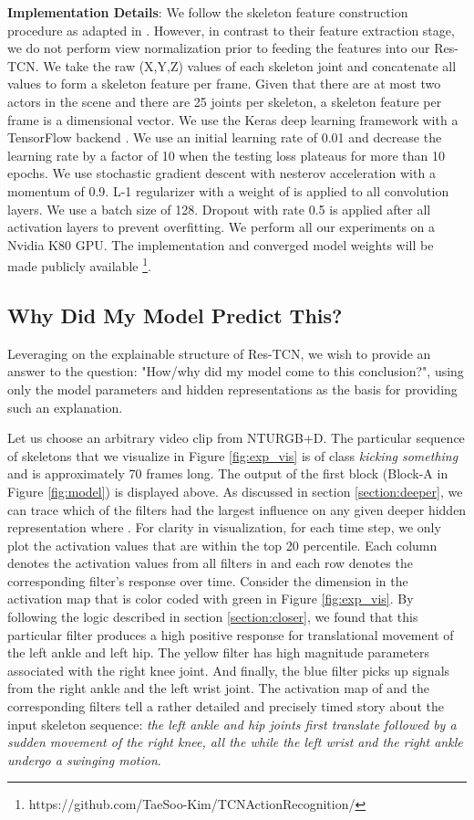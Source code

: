 \documentclass[10pt,twocolumn,letterpaper]{article}
\begin{document}
\textbf{Implementation Details}: We follow the skeleton feature construction procedure as adapted in \cite{nturgdb2016,Song2017}. However, in contrast to their feature extraction stage, we do not perform view normalization prior to feeding the features into our Res-TCN. We take the raw (X,Y,Z) values of each skeleton joint and concatenate all values to form a skeleton feature per frame. Given that there are at most two actors in the scene and there are 25 joints per skeleton, a skeleton feature per frame is a  dimensional vector. We use the Keras deep learning framework \cite{keras} with a TensorFlow backend \cite{tensorflow}. We use an initial learning rate of 0.01 and decrease the learning rate by a factor of 10 when the testing loss plateaus for more than 10 epochs. We use stochastic gradient descent with nesterov acceleration with a momentum of 0.9. L-1 regularizer with a weight of  is applied to all convolution layers. We use a batch size of 128. Dropout \cite{dropout} with rate 0.5 is applied after all activation layers to prevent overfitting. We perform all our experiments on a Nvidia K80 GPU. The implementation and converged model weights will be made publicly available \footnote{https://github.com/TaeSoo-Kim/TCNActionRecognition/}.


\subsection{Why Did My Model Predict This?}
Leveraging on the explainable structure of Res-TCN, we wish to provide an answer to the question: "How/why did my model come to this conclusion?", using only the model parameters and hidden representations as the basis for providing such an explanation. 

Let us choose an arbitrary video clip from NTURGB+D. The particular sequence of skeletons that we visualize in Figure \ref{fig:exp_vis} is of class \textit{kicking something} and is approximately 70 frames long. The output of the first block (Block-A in Figure \ref{fig:model}) is displayed above. As discussed in section \ref{section:deeper}, we can trace which of the  filters had the largest influence on any given deeper hidden representation  where . For clarity in visualization, for each time step, we only plot the activation values that are within the top 20 percentile. Each column denotes the activation values from all filters in  and each row denotes the corresponding filter's response over time. Consider the dimension in the activation map that is color coded with green in Figure \ref{fig:exp_vis}. By following the logic described in section \ref{section:closer},  we found that this particular filter produces a high positive response for translational movement of the left ankle and left hip. The yellow filter has high magnitude parameters associated with the right knee joint. And finally, the blue filter picks up signals from the right ankle and the left wrist joint. The activation map of  and the corresponding  filters tell a rather detailed and precisely timed story about the input skeleton sequence: \textit{the left ankle and hip joints first translate followed by a sudden movement of the right knee, all the while the left wrist and the right ankle undergo a swinging motion}. 
\end{document}

